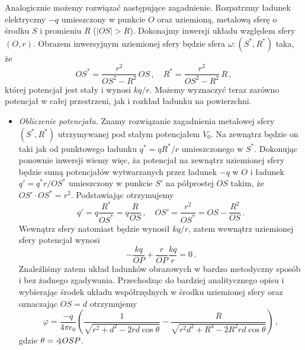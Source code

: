 \documentclass[../main.tex]{subfiles}
\begin{document}
\begin{enumerate}
    Analogicznie możemy rozwiązać następujące zagadnienie. Rozpatrzmy ładunek elektryczny \(-q\) umieszczony w punkcie \(O\) oraz uziemioną, metalową sferę o środku \(S\) i promieniu \(R\) (\(|OS|>R\)). Dokonajmy inwersji układu względem sfery \((O,r)\). Obrazem inwersyjnym uziemionej sfery będzie sfera \(\omega:(S^*,R^*)\) taka, że
    \begin{equation*}
        OS^*=\frac{r^2}{OS^2-R^2}\,OS\,,\quad R^*=\frac{r^2}{OS^2-R^2}\,R\,,
    \end{equation*}
    której potencjał jest stały i wynosi \(kq/r\). Możemy wyznaczyć teraz zarówno potencjał w całej przestrzeni, jak i rozkład ładunku na powierzchni.
    \begin{itemize}
        \item \textit{Obliczenie potencjału.} Znamy rozwiązanie zagadnienia metalowej sfery \((S^*,R^*)\) utrzymywanej pod stałym potencjałem \(V_0\). Na zewnątrz będzie on taki jak od punktowego ładunku \(q^*=qR^*/r\) umieszczonego w \(S^*\). Dokonując ponownie inwersji wiemy więc, ża potencjał na zewnątrz uziemionej sfery będzie sumą potencjałów wytwarzanych przez ładunek \(-q\) w \(O\) i ładunek \(q'=q^*r/OS^*\) umieszczony w punkcie \(S'\) na półprostej \(OS\) takim, że \(OS'\cdot OS^*=r^2\). Podstawiając otrzymujemy
        \begin{equation*}
            q'=q\frac{R^*}{OS^*}=q\frac{R}{OS}\,,\quad OS'=\frac{r^2}{OS^*}=OS-\frac{R^2}{OS}\,.
        \end{equation*}
        Wewnątrz sfery natomiast będzie wynosił \(kq/r\), zatem wewnątrz uziemionej sfery potencjał wynosi
        \begin{equation*}
            -\frac{kq}{OP}+\frac{r}{OP}\frac{kq}{r}=0\,.
        \end{equation*}
        Znaleźliśmy zatem układ ładunków obrazowych w bardzo metodyczny sposób i bez żadnego zgadywania. Przechodząc do bardziej analitycznego opisu i wybierając środek układu współrzędnych w środku uziemionej sfery oraz oznaczając \(OS=d\) otrzymujemy
        \begin{equation*}
            \varphi=\frac{-q}{4\pi\epsilon_0}\left(\frac{1}{\sqrt{r^2+d^2-2rd\cos\theta}}-\frac{R}{\sqrt{r^2d^2+R^4-2R^2rd\cos\theta}}\right)\,,
        \end{equation*}
        gdzie \(\theta=\mathord{<\mspace{-9mu}\mathrel{)}\mspace{2mu}} OSP\).
        

\end{itemize}
\end{enumerate}
\end{document}

